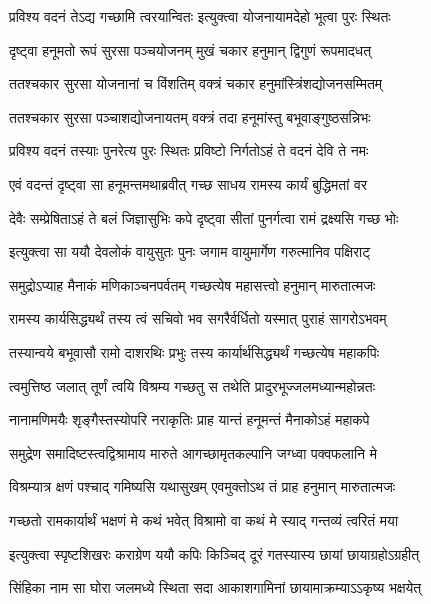 \twolineshloka
{प्रविश्य वदनं तेऽद्य गच्छामि त्वरयान्वितः}
{इत्युक्त्वा योजनायामदेहो भूत्वा पुरः स्थितः} %

\twolineshloka
{दृष्ट्वा हनूमतो रूपं सुरसा पञ्चयोजनम्}
{मुखं चकार हनुमान् द्विगुणं रूपमादधत्} %

\twolineshloka
{ततश्चकार सुरसा योजनानां च विंशतिम्}
{वक्त्रं चकार हनुमांस्त्रिंशद्योजनसम्मितम्} %

\twolineshloka
{ततश्चकार सुरसा पञ्चाशद्योजनायतम्}
{वक्त्रं तदा हनूमांस्तु बभूवाङ्गुष्ठसन्निभः} %

\twolineshloka
{प्रविश्य वदनं तस्याः पुनरेत्य पुरः स्थितः}
{प्रविष्टो निर्गतोऽहं ते वदनं देवि ते नमः} %

\twolineshloka
{एवं वदन्तं दृष्ट्वा सा हनूमन्तमथाब्रवीत्}
{गच्छ साधय रामस्य कार्यं बुद्धिमतां वर} %

\twolineshloka
{देवैः सम्प्रेषिताऽहं ते बलं जिज्ञासुभिः कपे}
{दृष्ट्वा सीतां पुनर्गत्वा रामं द्रक्ष्यसि गच्छ भोः} %

\twolineshloka
{इत्युक्त्वा सा ययौ देवलोकं वायुसुतः पुनः}
{जगाम वायुमार्गेण गरुत्मानिव पक्षिराट्} %

\twolineshloka
{समुद्रोऽप्याह मैनाकं मणिकाञ्चनपर्वतम्}
{गच्छत्येष महासत्त्वो हनुमान् मारुतात्मजः} %

\twolineshloka
{रामस्य कार्यसिद्ध्यर्थं तस्य त्वं सचिवो भव}
{सगरैर्वर्धितो यस्मात् पुराहं सागरोऽभवम्} %

\twolineshloka
{तस्यान्वये बभूवासौ रामो दाशरथिः प्रभुः}
{तस्य कार्यार्थसिद्ध्यर्थं गच्छत्येष महाकपिः} %

\twolineshloka
{त्वमुत्तिष्ठ जलात् तूर्णं त्वयि विश्रम्य गच्छतु}
{स तथेति प्रादुरभूज्जलमध्यान्महोन्नतः} %

\twolineshloka
{नानामणिमयैः शृङ्गैस्तस्योपरि नराकृतिः}
{प्राह यान्तं हनूमन्तं मैनाकोऽहं महाकपे} %

\twolineshloka
{समुद्रेण समादिष्टस्त्वद्विश्रामाय मारुते}
{आगच्छामृतकल्पानि जग्ध्वा पक्वफलानि मे} %

\twolineshloka
{विश्रम्यात्र क्षणं पश्चाद् गमिष्यसि यथासुखम्}
{एवमुक्तोऽथ तं प्राह हनुमान् मारुतात्मजः} %

\twolineshloka
{गच्छतो रामकार्यार्थं भक्षणं मे कथं भवेत्}
{विश्रामो वा कथं मे स्याद् गन्तव्यं त्वरितं मया} %

\twolineshloka
{इत्युक्त्वा स्पृष्टशिखरः कराग्रेण ययौ कपिः}
{किञ्चिद् दूरं गतस्यास्य छायां छायाग्रहोऽग्रहीत्} %

\twolineshloka
{सिंहिका नाम सा घोरा जलमध्ये स्थिता सदा}
{आकाशगामिनां छायामाक्रम्याऽऽकृष्य भक्षयेत्} %


